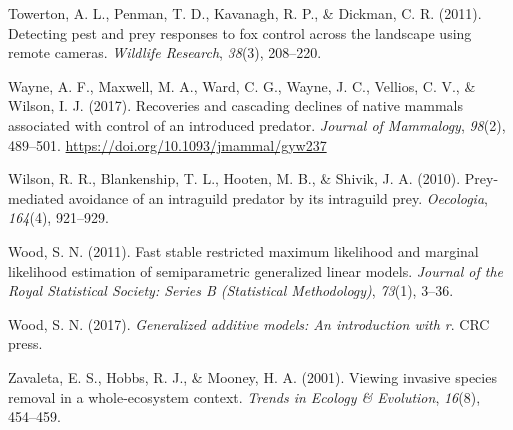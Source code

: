 \documentclass[]{elsarticle} %
\begin{document}
\leavevmode\hypertarget{ref-towerton2011}{}%
Towerton, A. L., Penman, T. D., Kavanagh, R. P., \& Dickman, C. R. (2011). Detecting pest and prey responses to fox control across the landscape using remote cameras. \emph{Wildlife Research}, \emph{38}(3), 208--220.

\leavevmode\hypertarget{ref-wayne2017recoveries}{}%
Wayne, A. F., Maxwell, M. A., Ward, C. G., Wayne, J. C., Vellios, C. V., \& Wilson, I. J. (2017). Recoveries and cascading declines of native mammals associated with control of an introduced predator. \emph{Journal of Mammalogy}, \emph{98}(2), 489--501. \url{https://doi.org/10.1093/jmammal/gyw237}

\leavevmode\hypertarget{ref-wilson2010prey}{}%
Wilson, R. R., Blankenship, T. L., Hooten, M. B., \& Shivik, J. A. (2010). Prey-mediated avoidance of an intraguild predator by its intraguild prey. \emph{Oecologia}, \emph{164}(4), 921--929.

\leavevmode\hypertarget{ref-wood2011}{}%
Wood, S. N. (2011). Fast stable restricted maximum likelihood and marginal likelihood estimation of semiparametric generalized linear models. \emph{Journal of the Royal Statistical Society: Series B (Statistical Methodology)}, \emph{73}(1), 3--36.

\leavevmode\hypertarget{ref-wood2017}{}%
Wood, S. N. (2017). \emph{Generalized additive models: An introduction with r}. CRC press.

\leavevmode\hypertarget{ref-zavaleta2001}{}%
Zavaleta, E. S., Hobbs, R. J., \& Mooney, H. A. (2001). Viewing invasive species removal in a whole-ecosystem context. \emph{Trends in Ecology \& Evolution}, \emph{16}(8), 454--459.
\end{document}
